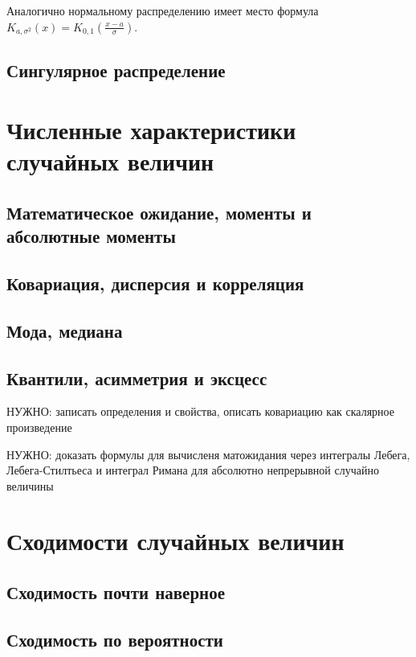 \documentclass[12pt]{article}
\numberwithin{theorem}{section}
\theoremstyle{definition}
\newcommand{\TODO}[1]{\textcolor{todocolor}{НУЖНО: #1}}
\begin{document}
	Аналогично нормальному распределению имеет место формула
	$ K_{a,\sigma^2}(x) = K_{0, 1}(\tfrac{x - a}{\sigma}) $.
	
	\subsection{Сингулярное распределение}
	
	\section{Численные характеристики случайных величин}
	
	\subsection{Математическое ожидание, моменты и абсолютные моменты}
	
	\subsection{Ковариация, дисперсия и корреляция}
	
	\subsection{Мода, медиана}
	
	\subsection{Квантили, асимметрия и эксцесс}
	
	\TODO{записать определения и свойства, описать ковариацию как скалярное произведение}
	
	\TODO{доказать формулы для вычисленя матожидания через интегралы Лебега, Лебега-Стилтьеса и интеграл Римана для абсолютно непрерывной случайно величины}
	
	
	
	\section{Сходимости случайных величин}
	
	\subsection{Сходимость почти наверное}
	
	\subsection{Сходимость по вероятности}
	
\end{document}
